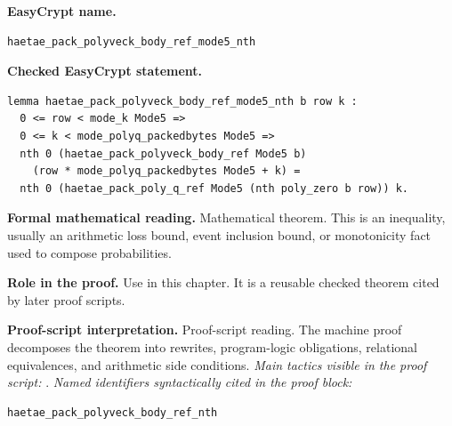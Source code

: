 \begin{formaltheorem}
\noindent\textbf{EasyCrypt name.}
\begin{lstlisting}[language=EasyCrypt,basicstyle=\ttfamily\scriptsize]
haetae_pack_polyveck_body_ref_mode5_nth
\end{lstlisting}
\noindent\textbf{Checked EasyCrypt statement.}
\begin{lstlisting}[language=EasyCrypt,basicstyle=\ttfamily\scriptsize]
lemma haetae_pack_polyveck_body_ref_mode5_nth b row k :
  0 <= row < mode_k Mode5 =>
  0 <= k < mode_polyq_packedbytes Mode5 =>
  nth 0 (haetae_pack_polyveck_body_ref Mode5 b)
    (row * mode_polyq_packedbytes Mode5 + k) =
  nth 0 (haetae_pack_poly_q_ref Mode5 (nth poly_zero b row)) k.
\end{lstlisting}
\noindent\textbf{Formal mathematical reading.}
Mathematical theorem. This is an inequality, usually an arithmetic loss bound, event inclusion bound, or monotonicity fact used to compose probabilities.

\noindent\textbf{Role in the proof.}
Use in this chapter. It is a reusable checked theorem cited by later proof scripts.

\noindent\textbf{Proof-script interpretation.}
Proof-script reading. The machine proof decomposes the theorem into rewrites, program-logic obligations, relational equivalences, and arithmetic side conditions.
\emph{Main tactics visible in the proof script:} .
\emph{Named identifiers syntactically cited in the proof block:}
\begin{lstlisting}[language=EasyCrypt,basicstyle=\ttfamily\scriptsize]
haetae_pack_polyveck_body_ref_nth
\end{lstlisting}

\end{formaltheorem}

